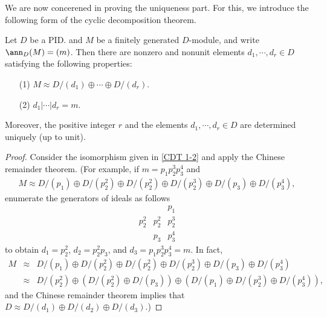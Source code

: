 We are now concerened in proving the uniqueness part.
For this, we introduce the following form of the cyclic decomposition theorem.
\begin{thm}\label{CDT 2}
    Let $D$ be a PID. and $M$ be a finitely generated $D$-module, and write $\ann_D(M)=(m)$.
    Then there are nonzero and nonunit elements $d_1, \cdots, d_r\in D$ satisfying the following properties:
    \begin{enumerate}
        \item[(1)]
        {
            $M \approx D/(d_1) \oplus \cdots \oplus D/(d_r)$.
        }
        \item[(2)]
        {
            $d_1|\cdots|d_r=m$.
        }
    \end{enumerate}
    Moreover, the positive integer $r$ and the elements $d_1, \cdots, d_r\in D$ are determined uniquely (up to unit).
\end{thm}
\begin{proof}
    Consider the isomorphism given in \cref{CDT 1-2} and apply the Chinese remainder theorem.
    (For example, if $m=p_1p_2^3p_3^4$ and
    \begin{align*}
        M \approx D/(p_1) \oplus D/(p_2^2) \oplus D/(p_2^2) \oplus D/(p_2^3) \oplus D/(p_3) \oplus D/(p_3^4),
    \end{align*}
    enumerate the generators of ideals as follows
    \begin{eqnarray*}
                &       &p_1\\
        p_2^2   &p_2^2  &p_2^3\\
                &p_3    &p_3^4    
    \end{eqnarray*}
    to obtain $d_1=p_2^2$, $d_2=p_2^2p_3$, and $d_3=p_1p_2^3p_3^4=m$.
    In fact,
    \begin{eqnarray*}
        M
        &\approx& D/(p_1) \oplus D/(p_2^2) \oplus D/(p_2^2) \oplus D/(p_2^3) \oplus D/(p_3) \oplus D/(p_3^4)
        \\
        &\approx& D/(p_2^2)\oplus\left(D/(p_2^2)\oplus D/(p_3)\right)\oplus\left(D/(p_1)\oplus D/(p_2^3)\oplus D/(p_3^4)\right),
    \end{eqnarray*}
    and the Chinese remainder theorem implies that $D\approx D/(d_1)\oplus D/(d_2)\oplus D/(d_3)$.)
\end{proof}

